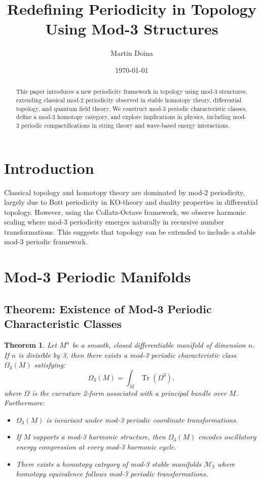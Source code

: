 \documentclass{article}  %
\title{Redefining Periodicity in Topology Using Mod-3 Structures}
\author{Martin Doina}
\institute{Independent Researcher \ \email{dhelamay@protonmail.com}}
\date{\today}
\newtheorem{theorem}{Theorem}
\begin{document}
\maketitle

\begin{abstract}
This paper introduces a new periodicity framework in topology using mod-3 structures, extending classical mod-2 periodicity observed in stable homotopy theory, differential topology, and quantum field theory. We construct mod-3 periodic characteristic classes, define a mod-3 homotopy category, and explore implications in physics, including mod-3 periodic compactifications in string theory and wave-based energy interactions.
\end{abstract}

\section{Introduction}

Classical topology and homotopy theory are dominated by mod-2 periodicity, largely due to Bott periodicity in KO-theory and duality properties in differential topology. However, using the Collatz-Octave framework, we observe harmonic scaling where mod-3 periodicity emerges naturally in recursive number transformations. This suggests that topology can be extended to include a stable mod-3 periodic framework.

\section{Mod-3 Periodic Manifolds}

\subsection{Theorem: Existence of Mod-3 Periodic Characteristic Classes}

\begin{theorem}
Let $M^n$ be a smooth, closed differentiable manifold of dimension $n$. If $n$ is divisible by 3, then there exists a mod-3 periodic characteristic class $\Omega_3(M)$ satisfying:
\begin{equation}
\Omega_3(M) = \int_M \operatorname{Tr}(\Omega^3),
\end{equation}
where $\Omega$ is the curvature 2-form associated with a principal bundle over $M$. Furthermore:
\begin{itemize}
    \item $\Omega_3(M)$ is invariant under mod-3 periodic coordinate transformations.
    \item If $M$ supports a mod-3 harmonic structure, then $\Omega_3(M)$ encodes oscillatory energy compression at every mod-3 harmonic cycle.
    \item There exists a homotopy category of mod-3 stable manifolds $\mathcal{M}_3$ where homotopy equivalence follows mod-3 periodic transformations.
\end{itemize}
\end{theorem}
\end{document}
